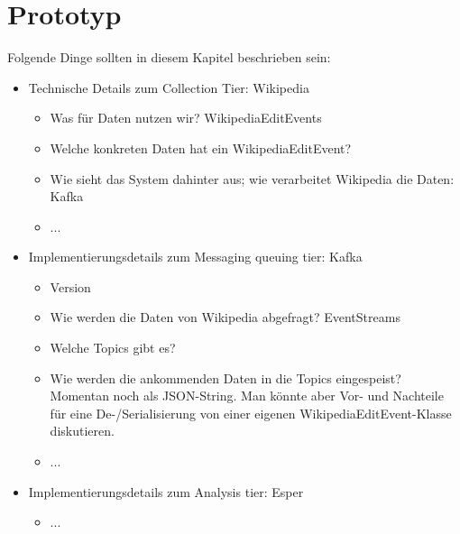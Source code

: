 \section{Prototyp}
Folgende Dinge sollten in diesem Kapitel beschrieben sein:

\begin{itemize}
    \item Technische Details zum Collection Tier: Wikipedia
    \begin{itemize}
        \item Was für Daten nutzen wir? WikipediaEditEvents
        \item Welche konkreten Daten hat ein WikipediaEditEvent?
        \item Wie sieht das System dahinter aus; wie verarbeitet Wikipedia die Daten: Kafka
        \item ...
    \end{itemize}
    \item Implementierungsdetails zum Messaging queuing tier: Kafka
    \begin{itemize}
        \item Version
        \item Wie werden die Daten von Wikipedia abgefragt? EventStreams
        \item Welche Topics gibt es?
        \item Wie werden die ankommenden Daten in die Topics eingespeist? Momentan noch als JSON-String.
        Man könnte aber Vor- und Nachteile für eine De-/Serialisierung von einer eigenen WikipediaEditEvent-Klasse diskutieren.
        \item ...
    \end{itemize}
    \item Implementierungsdetails zum Analysis tier: Esper
    \begin{itemize}
        \item ...
    \end{itemize}
\end{itemize}